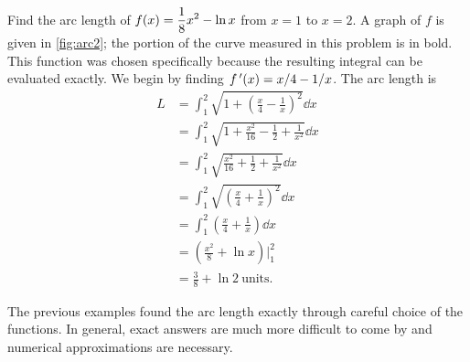 \begin{example}\label{ex_arc2}%
Find the arc length of $\displaystyle f(x) =\frac18x^2-\ln x$ from $x=1$ to $x=2$.
\solution
A graph of $f$ is given in \autoref{fig:arc2}; the portion of the curve measured in this problem is in bold.
This function was chosen specifically because the resulting integral can be evaluated exactly. We begin by finding $f\,'(x) = x/4-1/x$. The arc length is 
\begin{align*}
	L
	&=  \int_1^2 \sqrt{1+ \left(\frac x4-\frac1x\right)^2}\dd x \\
	&= 	\int_1^2 \sqrt{ 1 + \frac{x^2}{16} -\frac12 + \frac1{x^2} } \dd x \\
	&=	\int_1^2 \sqrt{ \frac{x^2}{16} +\frac12 + \frac1{x^2} } \dd x \\
	&=	\int_1^2	\sqrt{ \left(\frac x4 + \frac1x\right)^2 }\dd x \\
	&= \int_1^2 \left(\frac x4 + \frac1x\right) \dd x \\
	&=  \left(\frac{x^2}8 + \ln x\right)\Bigg|_1^2\\
	&=	\frac38+\ln 2\ \text{units}. %
\end{align*}
\end{example}

The previous examples found the arc length exactly through careful choice of the functions. In general, exact answers are much more difficult to come by and numerical approximations are necessary.

